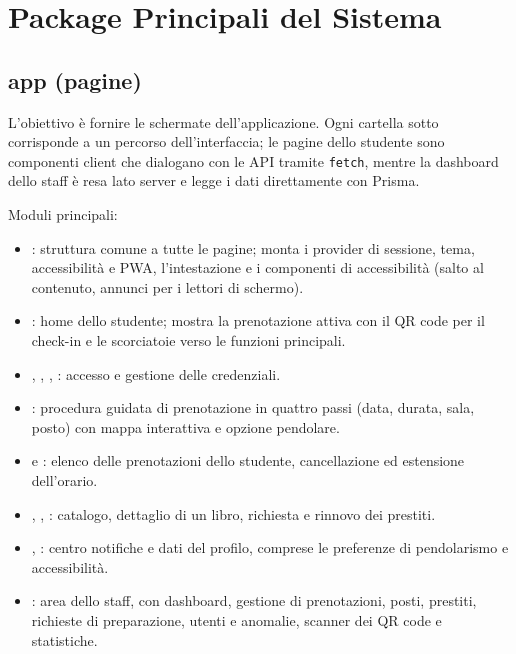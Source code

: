 \documentclass[11pt,a4paper,oneside,openany]{book}
\begin{document}
\section{Package Principali del Sistema}

\subsection{app (pagine)}

L'obiettivo è fornire le schermate dell'applicazione. Ogni cartella sotto
 corrisponde a un percorso dell'interfaccia; le pagine dello
studente sono componenti client che dialogano con le API tramite
\texttt{fetch}, mentre la dashboard dello staff è resa lato server e legge i
dati direttamente con Prisma.

Moduli principali:
\begin{itemize}
  \item {}: struttura comune a tutte le pagine; monta i provider
        di sessione, tema, accessibilità e PWA, l'intestazione e i componenti di
        accessibilità (salto al contenuto, annunci per i lettori di schermo).
  \item {}: home dello studente; mostra la prenotazione attiva con
        il QR code per il check-in e le scorciatoie verso le funzioni
        principali.
  \item {}, , ,
        : accesso e gestione delle credenziali.
  \item {}: procedura guidata di prenotazione in quattro passi
        (data, durata, sala, posto) con mappa interattiva e opzione pendolare.
  \item {} e : elenco delle
        prenotazioni dello studente, cancellazione ed estensione dell'orario.
  \item {}, , : catalogo, dettaglio
        di un libro, richiesta e rinnovo dei prestiti.
  \item {}, : centro notifiche e dati del profilo,
        comprese le preferenze di pendolarismo e accessibilità.
  \item {}: area dello staff, con dashboard, gestione di
        prenotazioni, posti, prestiti, richieste di preparazione, utenti e
        anomalie, scanner dei QR code e statistiche.
\end{itemize}
\end{document}

